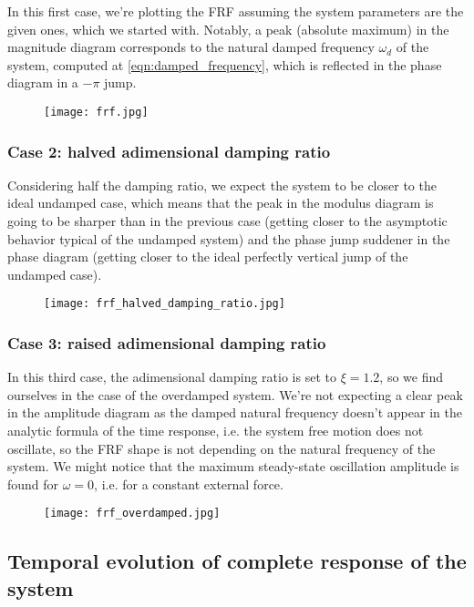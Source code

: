 \documentclass[a4paper,12pt,oneside]{article}
\begin{document}
In this first case, we're plotting the FRF assuming the system parameters are the given ones, which we started with. Notably, a peak (absolute maximum) in the magnitude diagram corresponds to the natural damped frequency $ \omega_d $ of the system, computed at \eqref{eqn:damped_frequency}, which is reflected in the phase diagram in a $ -\pi $ jump.

\begin{figure}
	\centering
	\texttt{[image: frf.jpg]}
\end{figure}

\subsubsection*{Case 2: halved adimensional damping ratio}

Considering half the damping ratio, we expect the system to be closer to the ideal undamped case, which means that the peak in the modulus diagram is going to be sharper than in the previous case (getting closer to the asymptotic behavior typical of the undamped system) and the phase jump suddener in the phase diagram (getting closer to the ideal perfectly vertical jump of the undamped case).

\begin{figure}
	\centering
	\texttt{[image: frf\_halved\_damping\_ratio.jpg]}
\end{figure}

\subsubsection*{Case 3: raised adimensional damping ratio}

In this third case, the adimensional damping ratio is set to $ \xi = 1.2 $, so we find ourselves in the case of the overdamped system. We're not expecting a clear peak in the amplitude diagram as the damped natural frequency doesn't appear in the analytic formula of the time response, i.e. the system free motion does not oscillate, so the FRF shape is not depending on the natural frequency of the system. We might notice that the maximum steady-state oscillation amplitude is found for $ \omega = 0 $, i.e. for a constant external force.

\begin{figure}
	\centering
	\texttt{[image: frf\_overdamped.jpg]}
\end{figure}

\subsection{Temporal evolution of complete response of the system}
\end{document}
